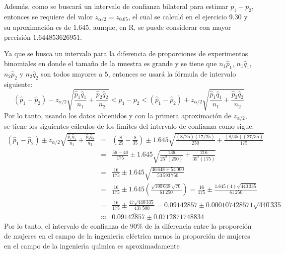 \begin{solucion}
\begin{itemize}
 \end{itemize}
 Adem\'as, como se buscar\'a un intervalo de confianza bilateral para estimar $p_1 - p_2$, entonces se requiere del valor $z_{\alpha/2} = z_{0.05}$, el cual se calcul\'o en el ejercicio 9.30 y su aproximaci\'on es de $1.645$, aunque, en R, se puede considerar con mayor precisi\'on $1.644853626951$.
 \par 
 Ya que se busca un intervalo para la diferencia de proporciones de experimentos binomiales en donde el tama\~no de la muestra es grande y se tiene que $n_1\hat{p}_1$, $n_1\hat{q}_1$, $n_2\hat{p}_2$ y $n_2\hat{q}_2$ son todos mayores a $5$, entonces se usar\'a la f\'ormula de intervalo siguiente:
 \begin{equation*}
  \left( \hat{p}_1 - \hat{p}_2 \right) - z_{\alpha/2}\sqrt{\frac{\hat{p}_1\hat{q}_1}{n_1} + \frac{\hat{p}_2\hat{q}_2}{n_2}} < p_1 - p_2 < \left( \hat{p}_1 - \hat{p}_2 \right) + z_{\alpha/2}\sqrt{\frac{\hat{p}_1\hat{q}_1}{n_1} + \frac{\hat{p}_2\hat{q}_2}{n_2}}
 \end{equation*}
 Por lo tanto, usando los datos obtenidos y con la primera aproximaci\'on de $z_{\alpha/2}$, se tiene los siguientes c\'alculos de los l\'{\i}mites del intervalo de confianza como sigue:
 \begin{eqnarray*}
  \left( \hat{p}_1 - \hat{p}_2 \right) \pm z_{\alpha/2}\sqrt{\frac{\hat{p}_1\hat{q}_1}{n_1} + \frac{\hat{p}_2\hat{q}_2}{n_2}} & = & \left( \frac{8}{25} - \frac{8}{35} \right) \pm 1.645 \sqrt{\frac{(8/25)(17/25)}{250} + \frac{(8/35)(27/35)}{175}} \\
  & = & \frac{56 - 40}{175} \pm 1.645 \sqrt{\frac{136}{25^2(250)} + \frac{216}{35^2(175)}} \\
  & = & \frac{16}{175} \pm 1.645\sqrt{\frac{46\,648 + 54\,000}{53\,593\,750}} \\
  & = & \frac{16}{175} \pm 1.645\left( \frac{\sqrt{100\,648}\sqrt{70}}{61\,250} \right) = \frac{16}{175} \pm \frac{1.645(4)\sqrt{440\,335}}{61\,250}\\
  & = & \frac{16}{175} \pm \frac{47\sqrt{440\,335}}{437\,500} = 0.09\overline{142857} \pm 0.000107\overline{428571}\sqrt{440\,335} \\
  & \approx & 0.09\overline{142857} \pm 0.0712871748834
 \end{eqnarray*}
 Por lo tanto, el intervalo de confianza de $90\%$ de la diferencia entre la proporci\'on de mujeres en el campo de la ingenier\'{\i}a el\'ectrica menos la proporci\'on de mujeres en el campo de la ingenier\'{\i}a qu\'{\i}mica es aproximadamente
 \begin{equation*}

\end{equation*}
\end{solucion}
